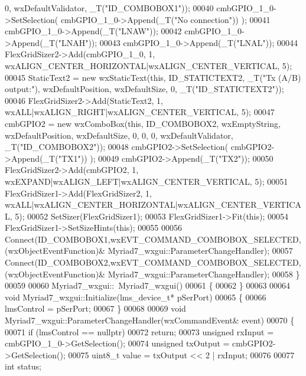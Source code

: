 \begin{DoxyCode}
       0, wxDefaultValidator, _T(\textcolor{stringliteral}{"ID\_COMBOBOX1"}));
00040     cmbGPIO\_1\_0->SetSelection( cmbGPIO\_1\_0->Append(_T(\textcolor{stringliteral}{"No connection"})) );
00041     cmbGPIO\_1\_0->Append(_T(\textcolor{stringliteral}{"LNAW"}));
00042     cmbGPIO\_1\_0->Append(_T(\textcolor{stringliteral}{"LNAH"}));
00043     cmbGPIO\_1\_0->Append(_T(\textcolor{stringliteral}{"LNAL"}));
00044     FlexGridSizer2->Add(cmbGPIO\_1\_0, 1, wxALIGN\_CENTER\_HORIZONTAL|wxALIGN\_CENTER\_VERTICAL, 5);
00045     StaticText2 = \textcolor{keyword}{new} wxStaticText(\textcolor{keyword}{this}, ID\_STATICTEXT2, _T(\textcolor{stringliteral}{"Tx (A/B) output:"}), wxDefaultPosition, 
      wxDefaultSize, 0, _T(\textcolor{stringliteral}{"ID\_STATICTEXT2"}));
00046     FlexGridSizer2->Add(StaticText2, 1, wxALL|wxALIGN\_RIGHT|wxALIGN\_CENTER\_VERTICAL, 5);
00047     cmbGPIO2 = \textcolor{keyword}{new} wxComboBox(\textcolor{keyword}{this}, ID\_COMBOBOX2, wxEmptyString, wxDefaultPosition, wxDefaultSize, 0, 0, 0,
       wxDefaultValidator, _T(\textcolor{stringliteral}{"ID\_COMBOBOX2"}));
00048     cmbGPIO2->SetSelection( cmbGPIO2->Append(_T(\textcolor{stringliteral}{"TX1"})) );
00049     cmbGPIO2->Append(_T(\textcolor{stringliteral}{"TX2"}));
00050     FlexGridSizer2->Add(cmbGPIO2, 1, wxEXPAND|wxALIGN\_LEFT|wxALIGN\_CENTER\_VERTICAL, 5);
00051     FlexGridSizer1->Add(FlexGridSizer2, 1, wxALL|wxALIGN\_CENTER\_HORIZONTAL|wxALIGN\_CENTER\_VERTICAL, 5);
00052     SetSizer(FlexGridSizer1);
00053     FlexGridSizer1->Fit(\textcolor{keyword}{this});
00054     FlexGridSizer1->SetSizeHints(\textcolor{keyword}{this});
00055 
00056     Connect(ID\_COMBOBOX1,wxEVT\_COMMAND\_COMBOBOX\_SELECTED,(wxObjectEventFunction)&
      Myriad7_wxgui::ParameterChangeHandler);
00057     Connect(ID\_COMBOBOX2,wxEVT\_COMMAND\_COMBOBOX\_SELECTED,(wxObjectEventFunction)&
      Myriad7\_wxgui::ParameterChangeHandler);
00058 \}
00059 
00060 Myriad7_wxgui::~Myriad7_wxgui()
00061 \{
00062 \}
00063 
00064 \textcolor{keywordtype}{void} Myriad7_wxgui::Initialize(lms_device_t* pSerPort)
00065 \{
00066     lmsControl = pSerPort;
00067 \}
00068 
00069 \textcolor{keywordtype}{void} Myriad7_wxgui::ParameterChangeHandler(wxCommandEvent& event)
00070 \{
00071     \textcolor{keywordflow}{if} (lmsControl == \textcolor{keyword}{nullptr})
00072         \textcolor{keywordflow}{return};
00073     \textcolor{keywordtype}{unsigned} rxInput = cmbGPIO\_1\_0->GetSelection();
00074     \textcolor{keywordtype}{unsigned} txOutput = cmbGPIO2->GetSelection();
00075     uint8\_t value = txOutput << 2 | rxInput;
00076 
00077     \textcolor{keywordtype}{int} status;

\end{DoxyCode}
